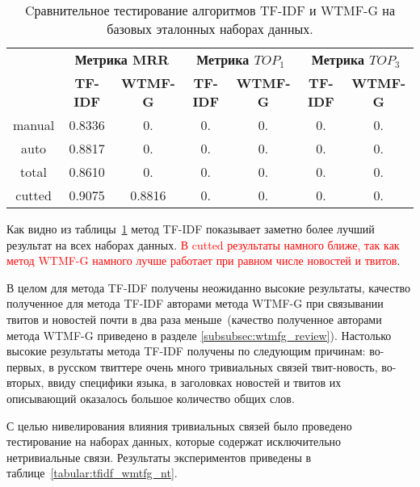     \begin{table}[ht!]
    \caption{Cравнительное тестирование алгоритмов TF-IDF и WTMF-G на базовых эталонных наборах данных. \bigskip}
    \centering

    \label{tabular:tfidf_wmtfg}
        \begin{tabular}{|c|c|c|c|c|c|c|}
            \hline
            \bf{\multirow{2}{*}{\specialcell{Набор данных}}} &
            \multicolumn{2}{|c|}{\bf{Метрика MRR}} &
            \multicolumn{2}{|c|}{\bf{Метрика $TOP_1$}} &
            \multicolumn{2}{|c|}{\bf{Метрика $TOP_3$}} \\ \cline{2-7}
            & \bf{TF-IDF} & \bf{WTMF-G} & \bf{TF-IDF} & \bf{WTMF-G} & \bf{TF-IDF} & \bf{WTMF-G} \\ \hline
            manual & 0.8336 & 0. & 0. & 0. & 0. & 0. \\ \hline
            auto & 0.8817 & 0. & 0. & 0. & 0. & 0. \\ \hline
            total & 0.8610 & 0. & 0. & 0. & 0. & 0. \\ \hline
            cutted & 0.9075 & 0.8816 & 0. & 0. & 0. & 0. \\ \hline
        \end{tabular}
    \end{table}

    Как видно из таблицы~\ref{tabular:tfidf_wmtfg} метод TF-IDF показывает заметно более лучший результат на всех наборах данных.
    \textcolor{red}{В cutted  результаты намного ближе, так как метод WTMF-G намного лучше работает при равном числе новостей и твитов}. 

    В целом для метода TF-IDF получены неожиданно высокие результаты, качество полученное для метода TF-IDF авторами метода WTMF-G при связывании твитов и новостей почти в два раза меньше~(качество полученное авторами метода WTMF-G приведено в разделе \ref{subsubsec:wtmfg_review}).
    Настолько высокие результаты метода TF-IDF получены по следующим причинам: во-первых, в русском твиттере очень много тривиальных связей твит-новость, во-вторых, ввиду специфики языка, в заголовках новостей и твитов их описывающий оказалось большое количество общих слов.

    С целью нивелирования влияния тривиальных связей было проведено тестирование на наборах данных, которые содержат исключительно нетривиальные связи. Результаты экспериментов приведены в таблице~\ref{tabular:tfidf_wmtfg_nt}.



